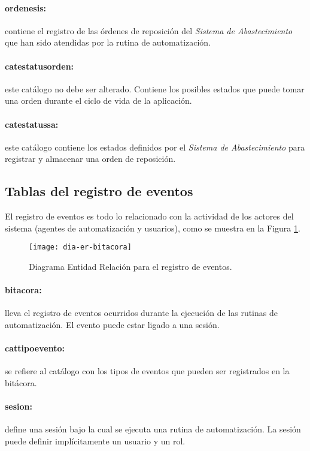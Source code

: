 \paragraph{ordenes{\textunderscore}is:} contiene el registro de las órdenes de reposición del \textit{Sistema de Abastecimiento} que han sido atendidas por la rutina de automatización.
\paragraph{cat{\textunderscore}estatus{\textunderscore}orden:} este catálogo no debe ser alterado. Contiene los posibles estados que puede tomar una orden durante el ciclo de vida de la aplicación.
\paragraph{cat{\textunderscore}estatus{\textunderscore}sa:} este catálogo contiene los estados definidos por el \textit{Sistema de Abastecimiento} para registrar y almacenar una orden de reposición.


\subsection{Tablas del registro de eventos}
El registro de eventos es todo lo relacionado con la actividad de los actores del sistema (agentes de automatización y usuarios), como se muestra en la Figura \ref{fig:dia-er-bitacora}.
\begin{figure}[h]
  \centering
  \texttt{[image: dia-er-bitacora]} 
  \caption{Diagrama Entidad Relación para el registro de eventos.}
  \label{fig:dia-er-bitacora}
\end{figure}
\paragraph{bitacora:} lleva el registro de eventos ocurridos durante la ejecución de las rutinas de automatización. El evento puede estar ligado a una sesión.
\paragraph{cat{\textunderscore}tipo{\textunderscore}evento:} se refiere al catálogo con los tipos de eventos que pueden ser registrados en la bitácora.
\paragraph{sesion:} define una sesión bajo la cual se ejecuta una rutina de automatización. La sesión puede definir implícitamente un usuario y un rol.


